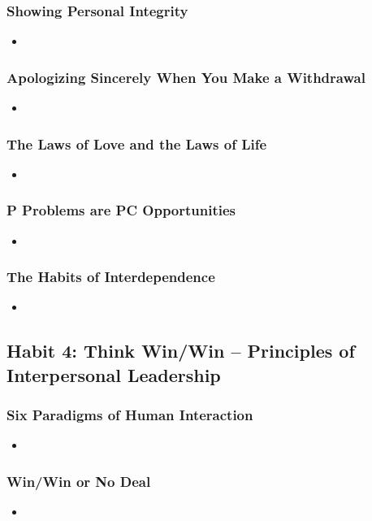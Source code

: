 \documentclass[11pt]{article}
\begin{document}
\subsubsection{Showing Personal Integrity}
\begin{itemize}
\item 
\end{itemize}
\subsubsection{Apologizing Sincerely When You Make a Withdrawal}
\begin{itemize}
\item 
\end{itemize}
\subsubsection{The Laws of Love and the Laws of Life}
\begin{itemize}
\item 
\end{itemize}
\subsubsection{P Problems are PC Opportunities}
\begin{itemize}
\item 
\end{itemize}
\subsubsection{The Habits of Interdependence}
\begin{itemize}
\item 
\end{itemize}
\subsection{Habit 4: Think Win/Win -- Principles of Interpersonal Leadership}
\subsubsection{Six Paradigms of Human Interaction}
\begin{itemize}
\item 
\end{itemize}
\subsubsection{Win/Win or No Deal}
\begin{itemize}
\item 
\end{itemize}
\end{document}
